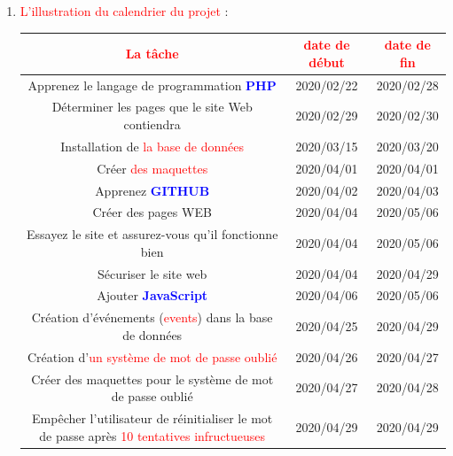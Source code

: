 \documentclass{article}
\begin{document}
\begin{enumerate}
\begin{enumerate}
    \end{enumerate}
   \item \textcolor{red}{\huge L'illustration du calendrier du projet} :  
   \vspace{1.2cm}
   
         \hspace*{-1.2in}
        \begin{tabular}{|c | c | c|}
        \hline
          \textcolor{red}{\Large La tâche} & \textcolor{red}{\Large date de début} & \textcolor{red}{\Large date de fin}\\ 
        \hline
        Apprenez le langage de programmation \textcolor{blue}{\textbf{PHP}} & 2020/02/22 & 2020/02/28 \\ 
        \hline
        Déterminer les pages que le site Web contiendra & 2020/02/29 & 2020/02/30 \\ 
        \hline
        Installation de \textcolor{red}{la base de données} & 2020/03/15 & 2020/03/20\\
        \hline
        Créer \textcolor{red}{des maquettes} & 2020/04/01  & 2020/04/01\\
        \hline
        Apprenez \textcolor{blue}{\textbf{GITHUB}} & 2020/04/02  & 2020/04/03\\
        \hline
        Créer des pages WEB & 2020/04/04  & 2020/05/06\\
        \hline
        Essayez le site et assurez-vous qu'il fonctionne bien & 2020/04/04  & 2020/05/06\\
		\hline        
        Sécuriser le site web & 2020/04/04  & 2020/04/29\\
        \hline
        Ajouter \textcolor{blue}{\textbf{JavaScript}} & 2020/04/06  & 2020/05/06\\
        \hline
        Création d'événements (\textcolor{red}{events}) dans la base de données & 2020/04/25 & 2020/04/29\\
        \hline
         Création d'\textcolor{red}{un système de mot de passe oublié} & 2020/04/26 & 2020/04/27\\
        \hline
        Créer des maquettes pour le système de mot de passe oublié & 2020/04/27  & 2020/04/28\\
        \hline
        Empêcher l'utilisateur de réinitialiser le mot de passe après \textcolor{red}{10 tentatives infructueuses} & 2020/04/29  & 2020/04/29\\
        \hline
        \end{tabular}
        

\end{enumerate}
\end{document}
